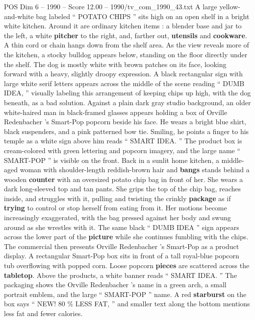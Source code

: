 \begin{textsample}{POS Dim 6 – 1990 – Score 12.00 – 1990/tv\_com\_1990\_43.txt}  \label{ex:f6_pos_071}
A large yellow-and-white bag labeled “ POTATO CHIPS ” sits high on an open shelf in a bright white kitchen.
Around it are ordinary kitchen items : a blender base and jar to the left, a white \textbf{pitcher} to the right, and, farther out, \textbf{utensils} and \textbf{cookware}.
A thin cord or chain hangs down from the shelf area.
As the view reveals more of the kitchen, a stocky bulldog appears below, standing on the floor directly under the shelf.
The dog is mostly white with brown patches on its face, looking forward with a heavy, slightly droopy expression.
A black rectangular sign with large white serif letters appears across the middle of the scene reading “ DUMB IDEA, ” visually labeling this arrangement of keeping chips up high, with the dog beneath, as a bad solution.
Against a plain dark gray studio background, an older white-haired man in black-framed glasses appears holding a box of Orville Redenbacher ’s Smart-Pop popcorn beside his face.
He wears a bright blue shirt, black suspenders, and a pink patterned bow tie.
Smiling, he points a finger to his temple as a white sign above him reads “ SMART IDEA. ” The product box is cream-colored with green lettering and popcorn imagery, and the large name “ SMART-POP ” is visible on the front.
Back in a sunlit home kitchen, a middle-aged woman with shoulder-length reddish-brown hair and \textbf{bangs} stands behind a wooden \textbf{counter} with an oversized potato chip bag in front of her.
She wears a dark long-sleeved top and tan pants.
She grips the top of the chip bag, reaches inside, and struggles with it, pulling and twisting the crinkly \textbf{package} as if \textbf{trying} to control or stop herself from eating from it.
Her motions become increasingly exaggerated, with the bag pressed against her body and swung around as she wrestles with it.
The same black “ DUMB IDEA ” sign appears across the lower part of the \textbf{picture} while she continues fumbling with the chips.
The commercial then presents Orville Redenbacher ’s Smart-Pop as a product display.
A rectangular Smart-Pop box sits in front of a tall royal-blue popcorn tub overflowing with popped corn.
Loose popcorn \textbf{pieces} are scattered across the \textbf{tabletop}.
Above the products, a white banner reads “ SMART IDEA. ” The packaging shows the Orville Redenbacher ’s name in a green arch, a small portrait emblem, and the large “ SMART-POP ” name.
A red \textbf{starburst} on the box says “ NEW! 80 \% LESS FAT, ” and smaller text along the bottom mentions less fat and fewer calories.

\end{textsample}
